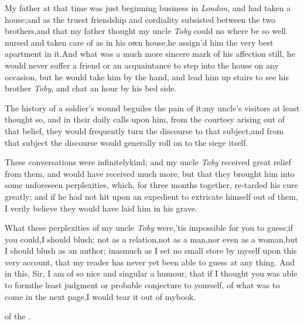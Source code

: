 \documentclass{article}
\begin{document}
My father at that time was just beginning business in
\textit{London}, and had taken a house;\tsk  and as the truest
friendship and cordiality subsisted between the two
brothers,\tsk  and that my father thought my uncle \textit{Toby} could no where be so well nursed
and taken care of as in his own house,\tsh  he
assign’d him the very best apartment in it.\tsk  And what
was a much more sincere mark of his affection still, he would never
suffer a friend or an acquaintance to step into the house on
any
occasion, but he would take him by the hand, and lead him up stairs
to see his brother \textit{Toby}, and chat an hour by his
bed side.

The history of a soldier’s wound beguiles the pain of
it;\tsk  my uncle’s visitors at least thought so, and in
their daily calls upon him, from the courtesy arising out of that
belief, they would frequently turn the discourse to that
subject,\tsk  and from that subject the discourse would generally
roll on to the siege itself.

These conversations were infinitely\break kind; and my uncle
\textit{Toby} received great relief from them, and would have
recei\-ved much more, but that they brought him into some unforeseen
perplexities, which, for three months together, re-\break tarded his
cure greatly; and if he had not hit upon an
expedient to extricate himself out of them, I verily believe they
would have laid him in his grave.

What these perplexities of my uncle \textit{Toby}
were,\tsh  ’tis impossible for you to guess;\tsk  if
you could,\tsk  I should blush; not as a relation,\tsk  not as a
man,\tsk  nor even as a woman,\tsk  but I should blush as an
author; inasmuch as I set no small store by myself upon this very
account, that my reader has never yet been able to guess at any
thing. And in this, Sir, I am of so nice and singular a humour,
that if I thought you was able to form\break the least judgment or
probable conjecture to yourself, of what was to come in the next
page,\tsk  I would tear it out of my\break book.

\bigskip
\centerline{\kern 4pt of the .}
\end{document}

